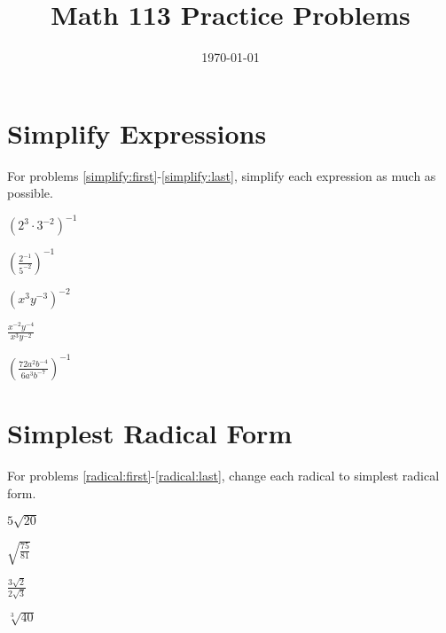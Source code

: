 \documentclass[fleqn,addpoints]{exam}
\title{Math 113 Practice Problems}
\author{}
\date{\today}
\begin{document}
\maketitle

\section{Simplify Expressions}

For problems \ref{simplify:first}-\ref{simplify:last}, simplify each expression as much as possible.

\begin{questions}

\question \( \displaystyle  (2^3 \cdot 3^{-2})^{-1} \)
\label{simplify:first}
\vspace{0.5 in}

\question \( \displaystyle \left( \frac{2^{-1}}{5^{-2}} \right) ^{-1} \)
\vspace{0.5 in}

\question \( \displaystyle (x^3y^{-3})^{-2} \)
\vspace{0.5 in}

\question \( \displaystyle \frac{x^{-2}y^{-4}}{x^3y^{-2}} \)
\vspace{0.5 in}

\question \( \displaystyle \left( \frac{72a^2b^{-4}}{6a^3b^{-7}} \right)^{-1} \)
\label{simplify:last}
\vspace{0.5 in}

\section{Simplest Radical Form}

For problems \ref{radical:first}-\ref{radical:last}, change each radical to simplest radical form.

\question \( \displaystyle 5\sqrt{20} \)
\label{radical:first}
\vspace{0.5 in}

\question \( \displaystyle \sqrt{\frac{75}{81}} \)
\vspace{0.5 in}


\question \( \displaystyle \frac{3 \sqrt{2}}{2 \sqrt{3}} \)
\vspace{0.5 in}

\question \( \displaystyle \sqrt[3]{40} \)
\vspace{0.5 in}


\end{questions}
\end{document}
